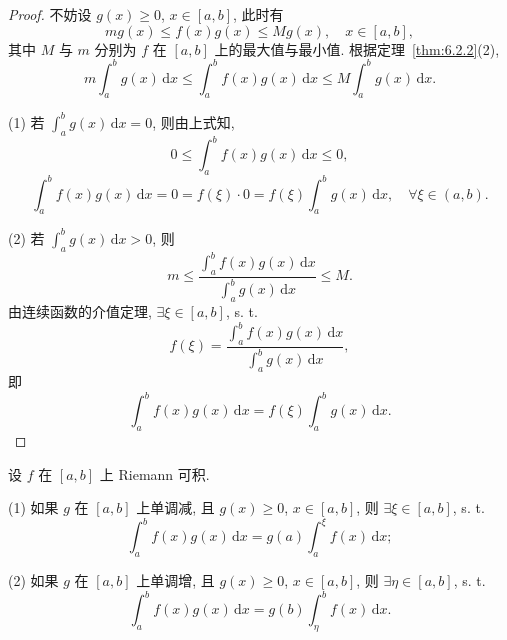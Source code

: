 \begin{proof}
不妨设 $g(x)\geqslant 0$, $x\in[a,b]$, 此时有
\[
mg(x)\leqslant f(x)g(x)\leqslant Mg(x),\quad x\in[a,b],
\]
其中 $M$ 与 $m$ 分别为 $f$ 在 $[a,b]$ 上的最大值与最小值. 根据定理~\ref{thm:6.2.2}(2),
\[
m\int_{a}^{b}g(x)\,\mathrm{d}x\leqslant\int_{a}^{b}f(x)g(x)\,\mathrm{d}x\leqslant M\int_{a}^{b}g(x)\,\mathrm{d}x.
\]

(1) 若 $\int_{a}^{b}g(x)\,\mathrm{d}x=0$, 则由上式知,
\[
0\leqslant\int_{a}^{b}f(x)g(x)\,\mathrm{d}x\leqslant 0,
\]
\[
\int_{a}^{b}f(x)g(x)\,\mathrm{d}x=0=f(\xi)\cdot 0=f(\xi)\int_{a}^{b}g(x)\,\mathrm{d}x,\quad\forall\xi\in(a,b).
\]

(2) 若 $\int_{a}^{b}g(x)\,\mathrm{d}x>0$, 则
\[
m\leqslant\frac{\displaystyle\int_{a}^{b}f(x)g(x)\,\mathrm{d}x}{\displaystyle\int_{a}^{b}g(x)\,\mathrm{d}x}\leqslant M.
\]
由连续函数的介值定理, $\exists\xi\in[a,b]$, s. t.
\[
f(\xi)=\frac{\displaystyle\int_{a}^{b}f(x)g(x)\,\mathrm{d}x}{\displaystyle\int_{a}^{b}g(x)\,\mathrm{d}x},
\]
即
\[
\int_{a}^{b}f(x)g(x)\,\mathrm{d}x=f(\xi)\int_{a}^{b}g(x)\,\mathrm{d}x.
\]
\end{proof}

\begin{theorem}[积分第二中值定理]\label{thm:6.2.7}
设 $f$ 在 $[a,b]$ 上 Riemann 可积.

(1) 如果 $g$ 在 $[a,b]$ 上单调减, 且 $g(x)\geqslant 0$, $x\in[a,b]$, 则 $\exists\xi\in[a,b]$, s. t.
\[
\int_{a}^{b}f(x)g(x)\,\mathrm{d}x=g(a)\int_{a}^{\xi}f(x)\,\mathrm{d}x;
\]

(2) 如果 $g$ 在 $[a,b]$ 上单调增, 且 $g(x)\geqslant 0$, $x\in[a,b]$, 则 $\exists\eta\in[a,b]$, s. t.
\[
\int_{a}^{b}f(x)g(x)\,\mathrm{d}x=g(b)\int_{\eta}^{b}f(x)\,\mathrm{d}x.
\]
\end{theorem}

